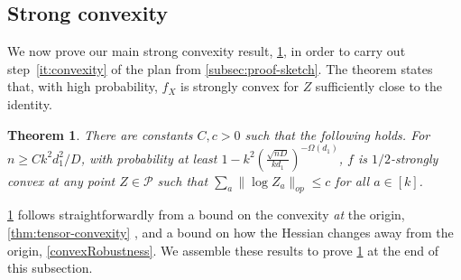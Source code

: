 \documentclass[aos]{imsart}
\newtheorem{theorem}{Theorem}[section]
\theoremstyle{definition}
\numberwithin{equation}{section}
\DeclareMathOperator{\PD}{PD}
\newcommand{\SPD}{\mathcal{P}}
\newcommand{\samp}{x}
\newcommand{\rv}{X}
\newcommand{\CF}[1]{{\color{purple}[CF: #1]}}
\begin{document}







\subsection{Strong convexity}\label{subsec:strong-convex}
We now prove our main strong convexity result, \cref{thm:ball-convexity}, in order to carry out step~\cref{it:convexity} of the plan from \cref{subsec:proof-sketch}. The theorem states that, with high probability, $f_X$ is strongly convex for $Z$ sufficiently close to the identity.



\begin{theorem}\label{thm:ball-convexity} There are constants $C,c>0$ such that the following holds. For $n \geq C k^2 d_1^2/D$, with probability at least $1 - k^2 \left(\frac {\sqrt{nD}}{kd_1}\right)^{ - \Omega(d_1)}$, $f$ is $1/2$-strongly convex at any point $Z \in \SPD$ such that $\sum_a \|\log Z_a\|_{op} \leq c$ for all $a \in [k]$.
\end{theorem}


\cref{thm:ball-convexity} follows straightforwardly from a bound on the convexity \emph{at} the origin,  \cref{thm:tensor-convexity} , and a bound on how the Hessian changes away from the origin, \cref{convexRobustness}. We assemble these results to prove \cref{thm:ball-convexity} at the end of this subsection. %
\end{document}
